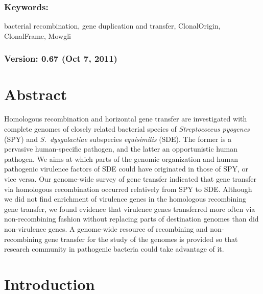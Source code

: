 \documentclass[english]{article}
\begin{document}
\subsubsection*{Keywords:}

bacterial recombination, gene duplication and transfer, ClonalOrigin,
ClonalFrame, Mowgli


\subsubsection*{Version: 0.67 (Oct 7, 2011) \clearpage{}}


\section*{Abstract}
Homologous recombination and horizontal gene transfer are investigated with
complete genomes of closely related bacterial species of \textit{Streptococcus
pyogenes} (SPY) and \textit{S.\ dysgalactiae} subspecies \textit{equisimilis}
(SDE).  The former is a pervasive human-specific pathogen, and the latter an
opportunistic human pathogen.  We aims at which parts of the genomic
organization and human pathogenic virulence factors of SDE could have
originated in those of SPY, or vice versa.  Our genome-wide survey of gene
transfer indicated that gene transfer via homologous recombination occurred
relatively from SPY to SDE.  Although we did not find enrichment of virulence
genes in the homologous recombining gene transfer, we found evidence that
virulence genes transferred more often via non-recombining fashion without
replacing parts of destination genomes than did non-virulence genes.  A
genome-wide resource of recombining and non-recombining gene transfer for the
study of the genomes is provided so that research community in pathogenic
bacteria could take advantage of it.

\clearpage{}

\section{Introduction}
\end{document}
